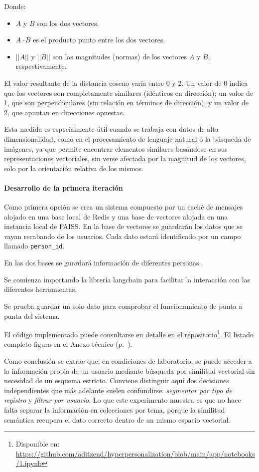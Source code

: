 Donde:
\begin{itemize}
    \item $A$ y $B$ son los dos vectores.
    \item $A \cdot B$ es el producto punto entre los dos vectores.
    \item $||A||$ y $||B||$ son las magnitudes (normas) de los vectores $A$ y $B$, respectivamente.
\end{itemize}

El valor resultante de la distancia coseno varía entre 0 y 2. Un valor de 0 indica que los vectores son completamente similares (idénticos en dirección); un valor de 1, que son perpendiculares (sin relación en términos de dirección); y un valor de 2, que apuntan en direcciones opuestas.

Esta medida es especialmente útil cuando se trabaja con datos de alta dimensionalidad, como en el procesamiento de lenguaje natural o la búsqueda de imágenes, ya que permite encontrar elementos similares basándose en sus representaciones vectoriales, sin verse afectada por la magnitud de los vectores, solo por la orientación relativa de los mismos.

\paragraph{Desarrollo de la primera iteración}

Como primera opción se crea un sistema compuesto por un caché de mensajes alojado en una base local de Redis y una base de vectores alojada en una instancia local de FAISS. En la base de vectores se guardarán los datos que se vayan recabando de los usuarios. Cada dato estará identificado por un campo llamado \texttt{person\_id}.

En las dos bases se guardará información de diferentes personas.

Se comienza importando la librería langchain para facilitar la interacción con las diferentes herramientas.

Se prueba guardar un solo dato para comprobar el funcionamiento de punta a punta del sistema.

El código implementado puede consultarse en detalle en el repositorio\footnote{Disponible en: \url{https://github.com/aditzend/hyperpersonalization/blob/main/app/notebooks/1.ipynb}}. El listado completo figura en el Anexo técnico (p.~\pageref{anexo:primera-iteracion-redis-faiss}).

Como conclusión se extrae que, en condiciones de laboratorio, se puede acceder a la información propia de un usuario mediante búsqueda por similitud vectorial sin necesidad de un esquema estricto. Conviene distinguir aquí dos decisiones independientes que más adelante suelen confundirse: \emph{segmentar por tipo de registro} y \emph{filtrar por usuario}. Lo que este experimento muestra es que no hace falta separar la información en colecciones por tema, porque la similitud semántica recupera el dato correcto dentro de un mismo espacio vectorial.


